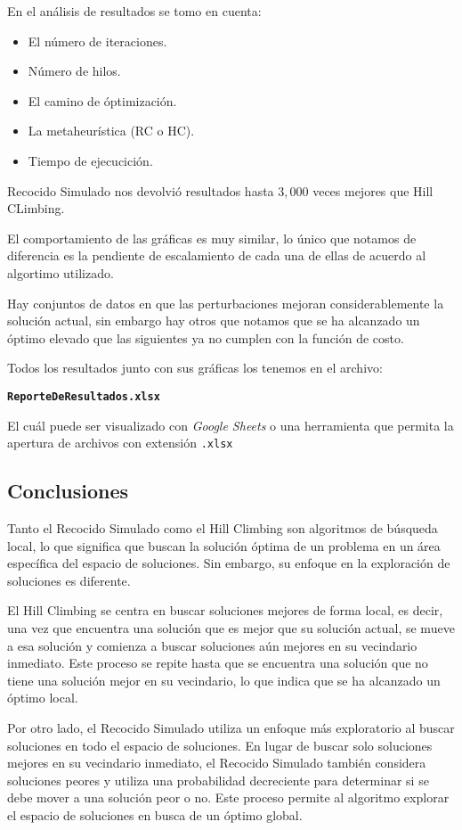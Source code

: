 \documentclass{article}
\begin{document}
En el análisis de resultados se tomo en cuenta:

\begin{itemize}
\item El número de iteraciones.
\item Número de hilos.
\item El camino de óptimización.
\item La metaheurística (RC o HC).
\item Tiempo de ejecucición.
\end{itemize}

Recocido Simulado nos devolvió resultados hasta $3,000$ veces mejores que Hill CLimbing.

El comportamiento de las gráficas es muy similar, lo único que notamos de diferencia es la pendiente de escalamiento de cada una de ellas de acuerdo al algortimo utilizado.

Hay conjuntos de datos en que las perturbaciones mejoran considerablemente la solución actual, sin embargo hay otros que notamos que se ha alcanzado un óptimo elevado que las siguientes ya no cumplen con la función de costo.

Todos los resultados junto con sus gráficas los tenemos en el archivo:

\textbf{\texttt{ReporteDeResultados.xlsx}}

El cuál puede ser visualizado con \textit{Google Sheets} o una herramienta que permita la apertura de archivos con extensión \texttt{.xlsx}
\subsection*{Conclusiones}
Tanto el Recocido Simulado como el Hill Climbing son algoritmos de búsqueda local, lo que significa que buscan la solución óptima de un problema en un área específica del espacio de soluciones. Sin embargo, su enfoque en la exploración de soluciones es diferente.

El Hill Climbing se centra en buscar soluciones mejores de forma local, es decir, una vez que encuentra una solución que es mejor que su solución actual, se mueve a esa solución y comienza a buscar soluciones aún mejores en su vecindario inmediato. Este proceso se repite hasta que se encuentra una solución que no tiene una solución mejor en su vecindario, lo que indica que se ha alcanzado un óptimo local.

Por otro lado, el Recocido Simulado utiliza un enfoque más exploratorio al buscar soluciones en todo el espacio de soluciones. En lugar de buscar solo soluciones mejores en su vecindario inmediato, el Recocido Simulado también considera soluciones peores y utiliza una probabilidad decreciente para determinar si se debe mover a una solución peor o no. Este proceso permite al algoritmo explorar el espacio de soluciones en busca de un óptimo global.
\end{document}
